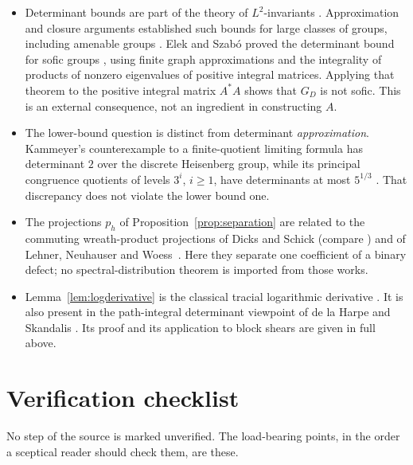 \documentclass[11pt]{article}
\theoremstyle{remark}
\numberwithin{equation}{section}
\begin{document}
\begin{itemize}[leftmargin=2em]
\item Determinant bounds are part of the theory of $L^2$-invariants \cite{Luck2002}. Approximation and closure arguments established such bounds for large classes of groups, including amenable groups \cite[Theorem 1.21, with its erratum]{Schick2001}. Elek and Szab\'o proved the determinant bound for sofic groups \cite[Theorem 5]{ElekSzabo2005}, using finite graph approximations and the integrality of products of nonzero eigenvalues of positive integral matrices. Applying that theorem to the positive integral matrix $A^*A$ shows that $G_D$ is not sofic. This is an external consequence, not an ingredient in constructing $A$.
\item The lower-bound question is distinct from determinant \emph{approximation}. Kammeyer's counterexample to a finite-quotient limiting formula has determinant $2$ over the discrete Heisenberg group, while its principal congruence quotients of levels $3^i$, $i\ge1$, have determinants at most $5^{1/3}$ \cite[Theorem 2 and Section 2]{Kammeyer2026}. That discrepancy does not violate the lower bound one.
\item The projections $p_h$ of Proposition~\ref{prop:separation} are related to the commuting wreath-product projections of Dicks and Schick \cite[Section 3]{DicksSchick2002} (compare \cite[Lemmas 3.1 and 3.4]{DicksSchick2002}) and of Lehner, Neuhauser and Woess~\cite[Section 2]{LehnerNeuhauserWoess2008}. Here they separate one coefficient of a binary defect; no spectral-distribution theorem is imported from those works.
\item Lemma~\ref{lem:logderivative} is the classical tracial logarithmic derivative \cite[Lemma 2]{FK1952}. It is also present in the path-integral determinant viewpoint of de la Harpe and Skandalis \cite[Lemma 1 and Proposition 2(d)]{deLaHarpeSkandalis1984}. Its proof and its application to block shears are given in full above.
\end{itemize}

\section{Verification checklist}
\label{sec:checklist}

No step of the source is marked unverified. The load-bearing points, in the order a sceptical reader should check them, are these.
\end{document}
